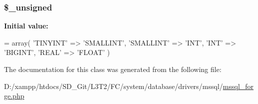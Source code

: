 \subsubsection[{\$\+\_\+unsigned}]{\setlength{\rightskip}{0pt plus 5cm}\$\+\_\+unsigned\hspace{0.3cm}{\ttfamily [protected]}}\label{class_c_i___d_b__mssql__forge_aae977ae6d61fa183f0b25422b6ddc31c}
{\bfseries Initial value\+:}
\begin{DoxyCode}
= array(
        \textcolor{stringliteral}{'TINYINT'}   => \textcolor{stringliteral}{'SMALLINT'},
        \textcolor{stringliteral}{'SMALLINT'}  => \textcolor{stringliteral}{'INT'},
        \textcolor{stringliteral}{'INT'}       => \textcolor{stringliteral}{'BIGINT'},
        \textcolor{stringliteral}{'REAL'}      => \textcolor{stringliteral}{'FLOAT'}
    )
\end{DoxyCode}


The documentation for this class was generated from the following file\+:\begin{DoxyCompactItemize}
\item 
D\+:/xampp/htdocs/\+S\+D\+\_\+\+Git/\+L3\+T2/\+F\+C/system/database/drivers/mssql/\hyperlink{mssql__forge_8php}{mssql\+\_\+forge.\+php}\end{DoxyCompactItemize}
